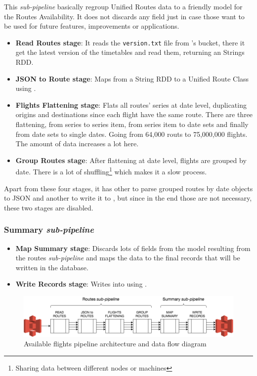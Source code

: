 This \textit{sub-pipeline} basically regroup Unified Routes data to a friendly model for the Routes Availability. It does not discards any field just in case those want to be used for future features, improvements or applications.

\begin{itemize}
    \item \textbf{Read Routes stage}: It reads the \texttt{version.txt} file from \squad's bucket, there it get the latest version of the timetables and read them, returning an Strings RDD.
    \item \textbf{JSON to Route stage}: Maps from a String RDD to a Unified Route Class using .
    \item \textbf{Flights Flattening stage}: Flats all routes' series at date level, duplicating origins and destinations since each flight have the same route. There are three flattening, from series to series item, from series item to date sets and finally from date sets to single dates. Going from 64,000 routs to 75,000,000 flights. The amount of data increases a lot here.
    \item \textbf{Group Routes stage}: After flattening at date level, flights are grouped by date. There is a lot of shuffling\footnote{Sharing data between different nodes or machines} which makes it a slow process.
\end{itemize}

Apart from these four stages, it has other to parse grouped routes by date objects to JSON\cite{json} and another to write it to , but since in the end those are not necessary, these two stages are disabled.

\subsubsection*{Summary \textit{sub-pipeline}}


\begin{itemize}
    \item \textbf{Map Summary stage}: Discards lots of fields from the model resulting from the routes \textit{sub-pipeline} and maps the data to the final records that will be written in the database.
    \item \textbf{Write Records stage}: Writes into  using .
\end{itemize}

\begin{figure}[H]
\centering
\includegraphics[scale=0.45]{diagrams/available-flights-pipeline-architecture.png}
\caption{Available flights pipeline architecture and data flow diagram}
\end{figure}

